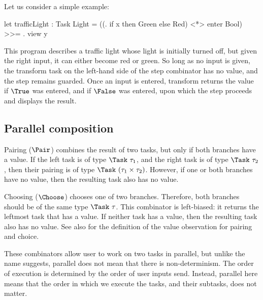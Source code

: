   Let us consider a simple example:
  \begin{TASK}
    let trafficLight : Task Light =
      ((\x. if x then Green else Red) <*> enter Bool) >>= \y. view y
  \end{TASK}
  This program describes a traffic light whose light is initially turned off, but given the right input, it can either become red or green.
  So long as no input is given, the transform task on the left-hand side of the step combinator has no value, and the step remains guarded.
  Once an input is entered, transform returns the value  if $\True$ was entered, and  if $\False$ was entered, upon which the step proceeds and displays the result.
\stopexample


\subsection{Parallel composition}

Pairing ($\Pair$) combines the result of two tasks, but only if both branches have a value.
If the left task is of type $\Task\ \tau_1$, and the right task is of type $\Task\ \tau_2$, then their pairing is of type $\Task\ (\tau_1 \times \tau_2)$.
However, if one or both branches have no value, then the resulting task also has no value.

Choosing ($\Choose$) chooses one of two branches.
Therefore, both branches should be of the same type $\Task\ \tau$.
This combinator is left-biased: it returns the leftmost task that has a value.
If neither task has a value, then the resulting task also has no value.
See also  for the definition of the value observation for pairing and choice.

These combinators allow user to work on two tasks in parallel, but unlike the name suggests, parallel does not mean that there is non-determinism.
The order of execution is determined by the order of user inputs send.
Instead, parallel here means that the order in which we execute the tasks, and their subtasks, does not matter.

